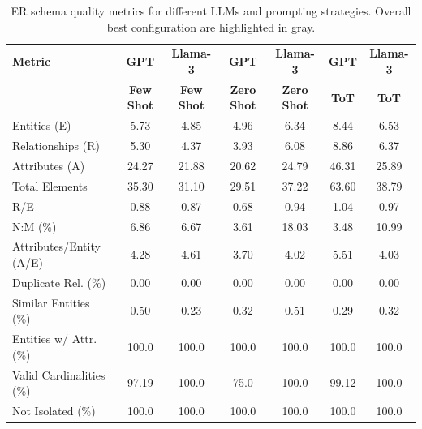 \begin{table}[t]
\centering
\scriptsize
\caption{ER schema quality metrics for different LLMs and prompting strategies. Overall best configuration are highlighted in gray.}
\label{tab:er_model_quality}
\setlength{\tabcolsep}{2pt}
\begin{tabular}{lcccccc}
\toprule
\textbf{Metric} &
\textbf{GPT} &
\textbf{Llama-3} &
\textbf{GPT} &
\textbf{Llama-3} &
\textbf{GPT} &
\textbf{Llama-3} \\
&
\textbf{Few Shot} &
\textbf{Few Shot} &
\textbf{Zero Shot} &
\textbf{Zero Shot} &
\textbf{ToT} &
\textbf{ToT} \\
\midrule
Entities (E)                & 5.73 & \cellcolor{gray!15}4.85 & 4.96 & 6.34 & 8.44 & 6.53 \\
Relationships (R)           & 5.30 & \cellcolor{gray!15}4.37 & 3.93 & 6.08 & 8.86 & 6.37 \\
Attributes (A)              & 24.27 & \cellcolor{gray!15}21.88 & 20.62 & 24.79 & 46.31 & 25.89 \\
Total Elements              & 35.30 & \cellcolor{gray!15}31.10 & 29.51 & 37.22 & 63.60 & 38.79 \\
\midrule
R/E                         & 0.88 & \cellcolor{gray!15}0.87 & 0.68 & 0.94 & 1.04 & 0.97 \\
N:M (\%)                    & 6.86 & \cellcolor{gray!15}6.67 & 3.61 & 18.03 & 3.48 & 10.99 \\
Attributes/Entity (A/E)     & 4.28 & \cellcolor{gray!15}4.61 & 3.70 & 4.02 & 5.51 & 4.03 \\
\midrule
Duplicate Rel. (\%)         & 0.00 & \cellcolor{gray!15}0.00 & 0.00 & 0.00 & 0.00 & 0.00 \\
Similar Entities (\%)       & 0.50 & \cellcolor{gray!15}0.23 & 0.32 & 0.51 & 0.29 & 0.32 \\
\midrule
Entities w/ Attr. (\%)      & 100.0 & \cellcolor{gray!15}100.0 & 100.0 & 100.0 & 100.0 & 100.0 \\
Valid Cardinalities (\%)    & 97.19 & \cellcolor{gray!15}100.0 & 75.0 & 100.0 & 99.12 & 100.0 \\
Not Isolated (\%)           & 100.0 & \cellcolor{gray!15}100.0 & 100.0 & 100.0 & 100.0 & 100.0 \\
\bottomrule
\end{tabular}
\end{table}
